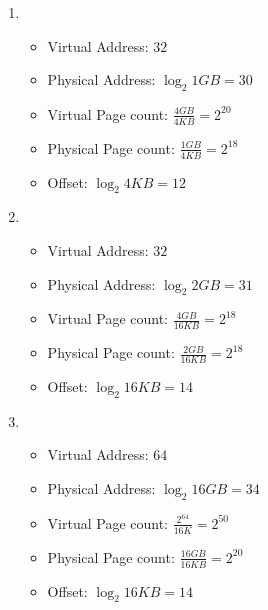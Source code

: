 \begin{latin}
    \begin{enumerate}
        \item \begin{itemize}
            \item Virtual Address: $32$
            \item Physical Address: $\log_2{1GB} = 30$
            \item Virtual Page count: $\frac{4GB}{4KB} = 2^{20}$
            \item Physical Page count: $\frac{1GB}{4KB} = 2^{18}$
            \item Offset: $\log_2{4KB} = 12$
        \end{itemize}
        \item \begin{itemize}
            \item Virtual Address: $32$
            \item Physical Address: $\log_2{2GB} = 31$
            \item Virtual Page count: $\frac{4GB}{16KB} = 2^{18}$
            \item Physical Page count: $\frac{2GB}{16KB} = 2^{18}$
            \item Offset: $\log_2{16KB} = 14$
        \end{itemize}
        \item \begin{itemize}
            \item Virtual Address: $64$
            \item Physical Address: $\log_2{16GB} = 34$
            \item Virtual Page count: $\frac{2^64}{16K} = 2^{50}$
            \item Physical Page count: $\frac{16GB}{16KB} = 2^{20}$
            \item Offset: $\log_2{16KB} = 14$
        \end{itemize}
    \end{enumerate}
\end{latin}